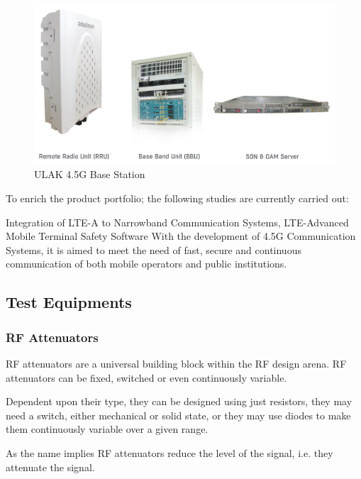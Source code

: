\begin{figure}[H]
	\center
	\setlength{\unitlength}{\textwidth} 
	\includegraphics[width=1.0\unitlength]{ulak}
	\caption{\label{fig:ulak}ULAK 4.5G Base Station }
\end{figure}	
	
	To enrich the product portfolio; the following studies are currently carried out:

	Integration of LTE-A to Narrowband Communication Systems,
LTE-Advanced Mobile Terminal Safety Software  
With the development of 4.5G Communication Systems, it is aimed to meet the need of fast, secure and continuous communication of both mobile operators and public institutions.


\vfill

\subsection{Test Equipments} 

\subsubsection{RF Attenuators}

	RF attenuators are a universal building block within the RF design arena. RF attenuators can be fixed, switched or even continuously variable.

Dependent upon their type, they can be designed using just resistors, they may need a switch, either mechanical or solid state, or they may use diodes to make them continuously variable over a given range.

	As the name implies RF attenuators reduce the level of the signal, i.e. they attenuate the signal.

